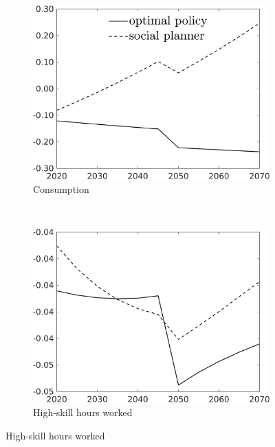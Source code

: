 \begin{figure}[h!!!]
	\centering
	\caption{Efficient and optimal allocation in deviation from laissez-faire	}\label{fig:optAll_percLf_dyn}
	\begin{subfigure}[]{0.4\textwidth}
		\caption{Consumption}
		\includegraphics[width=1\textwidth]{../../codding_model/own_basedOnFried/optimalPol_010922_revision/figures/all_13Sept22_Tplus30/C_PercentageLFDyn_Target_regime4_knspil0_spillover0_noskill0_sep0_xgrowth0_PV1_etaa0.79_lgd1.png}
	\end{subfigure}
\begin{minipage}[]{0.1\textwidth}
	\ 
\end{minipage}
	\begin{subfigure}[]{0.4\textwidth}
		\caption{High-skill hours worked}
		\includegraphics[width=1\textwidth]{../../codding_model/own_basedOnFried/optimalPol_010922_revision/figures/all_13Sept22_Tplus30/hh_PercentageLFDyn_Target_regime4_knspil0_spillover0_noskill0_sep0_xgrowth0_PV1_etaa0.79_lgd0.png}
	\end{subfigure}


\end{figure}
